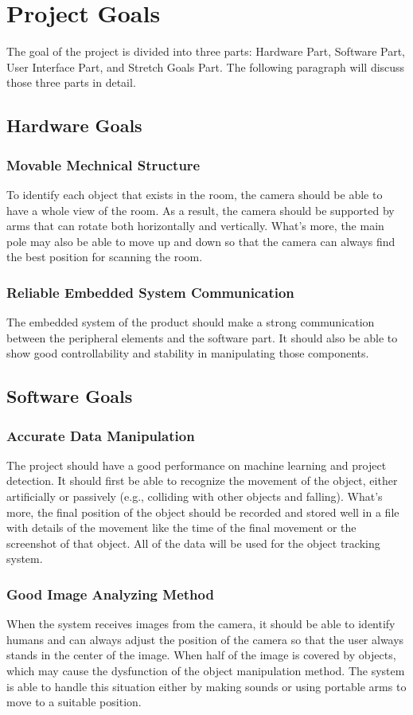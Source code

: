 \documentclass{article}
\begin{document}
\section{Project Goals}
The goal of the project is divided into three parts: Hardware Part, Software Part, User Interface Part, and Stretch Goals Part. The following paragraph will discuss those three parts in detail. 
\subsection{Hardware Goals}
\subsubsection{Movable Mechnical Structure}
To identify each object that exists in the room, the camera should be able to have a whole view of the room. As a result, the camera should be supported by arms that can rotate both horizontally and vertically. What’s more, the main pole may also be able to move up and down so that the camera can always find the best position for scanning the room.
\subsubsection{Reliable Embedded System Communication}
The embedded system of the product should make a strong communication between the peripheral elements and the software part. It should also be able to show good controllability and stability in manipulating those components.
\subsection{Software Goals}
\subsubsection{Accurate Data Manipulation}
The project should have a good performance on machine learning and project detection. It should first be able to recognize the movement of the object, either artificially or passively (e.g., colliding with other objects and falling). What’s more, the final position of the object should be recorded and stored well in a file with details of the movement like the time of the final movement or the screenshot of that object. All of the data will be used for the object tracking system.
\subsubsection{Good Image Analyzing Method}
When the system receives images from the camera, it should be able to identify humans and can always adjust the position of the camera so that the user always stands in the center of the image. When half of the image is covered by objects, which may cause the dysfunction of the object manipulation method. The system is able to handle this situation either by making sounds or using portable arms to move to a suitable position. 
\end{document}
